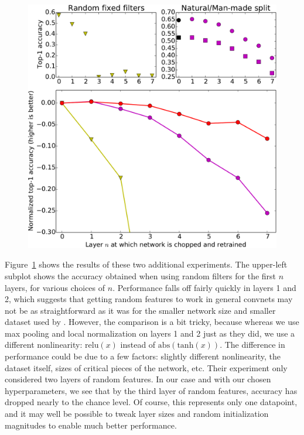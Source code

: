 \begin{figure}
\begin{center}
\includegraphics[width=1\linewidth]{plots/result_random_nm_combined_crop.pdf}
\end{center}
\caption{}
\label{fig:random_and_nm}
\end{figure}

Figure~\ref{fig:random_and_nm} shows the results of these two additional experiments. The upper-left subplot shows the accuracy obtained when using random filters for the first $n$ layers, for various choices of $n$. Performance falls off fairly quickly in layers 1 and 2, which suggests that getting random features to work in general convnets may not be as straightforward as it was for the smaller network size and smaller dataset used by \cite{Jarrett-ICCV2009}. However, the comparison is a bit tricky, because whereas we use max pooling and local normalization on layers 1 and 2 just as they did, we use a different nonlinearity: $\mathrm{relu}(x)$ instead of $\mathrm{abs}(\mathrm{tanh}(x))$. The difference in performance could be due to a few factors: slightly different nonlinearity, the dataset itself, sizes of critical pieces of the network, etc. Their experiment only considered two layers of random features. In our case and with our chosen hyperparameters, we see that by the third layer of random features, accuracy has dropped nearly to the chance level. Of course, this represents only one datapoint, and it may well be possible to tweak layer sizes and random initialization magnitudes to enable much better performance.

